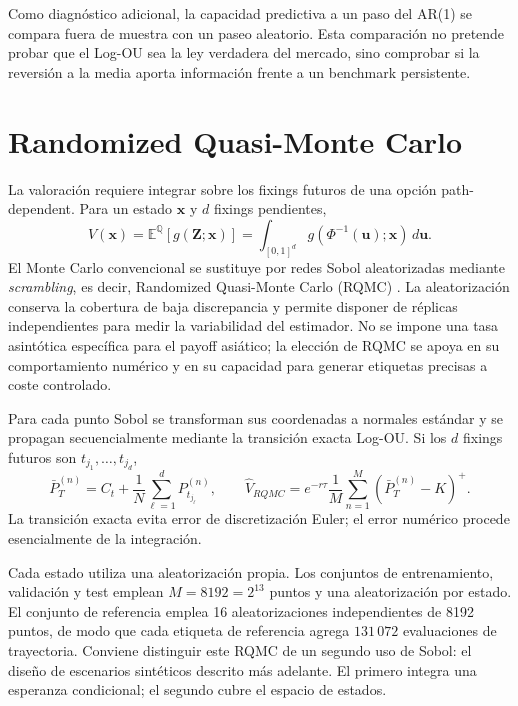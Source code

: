 Como diagnóstico adicional, la capacidad predictiva a un paso del AR(1) se
compara fuera de muestra con un paseo aleatorio. Esta comparación no pretende
probar que el Log-OU sea la ley verdadera del mercado, sino comprobar si la
reversión a la media aporta información frente a un benchmark persistente.


\section{Randomized Quasi-Monte Carlo}
\label{sec:rqmc}

La valoración requiere integrar sobre los fixings futuros de una opción
path-dependent. Para un estado $\mathbf x$ y $d$ fixings pendientes,
\begin{equation}
    V(\mathbf x)=\mathbb E^{\mathbb Q}[g(\mathbf Z;\mathbf x)]
    =\int_{[0,1]^d}g(\Phi^{-1}(\mathbf u);\mathbf x)\,d\mathbf u.
    \label{eq:unit_cube_integral}
\end{equation}
El Monte Carlo convencional se sustituye por redes Sobol aleatorizadas mediante
\textit{scrambling}, es decir, Randomized Quasi-Monte Carlo (RQMC)
\parencite{sobol_1967,owen_1997}. La aleatorización conserva la cobertura de
baja discrepancia y permite disponer de réplicas independientes para medir la
variabilidad del estimador. No se impone una tasa asintótica específica para el
payoff asiático; la elección de RQMC se apoya en su comportamiento numérico y en
su capacidad para generar etiquetas precisas a coste controlado.

Para cada punto Sobol se transforman sus coordenadas a normales estándar y se
propagan secuencialmente mediante la transición exacta Log-OU. Si los $d$
fixings futuros son $t_{j_1},\ldots,t_{j_d}$,
\begin{equation}
    \bar P_T^{(n)}=C_t+\frac{1}{N}\sum_{\ell=1}^{d}P_{t_{j_\ell}}^{(n)},
    \qquad
    \widehat V_{RQMC}=e^{-r\tau}\frac{1}{M}
    \sum_{n=1}^{M}(\bar P_T^{(n)}-K)^+.
    \label{eq:rqmc_asian_price}
\end{equation}
La transición exacta evita error de discretización Euler; el error numérico
procede esencialmente de la integración.

Cada estado utiliza una aleatorización propia. Los conjuntos de entrenamiento,
validación y test emplean $M=8192=2^{13}$ puntos y una aleatorización por estado.
El conjunto de referencia emplea 16 aleatorizaciones independientes de 8192
puntos, de modo que cada etiqueta de referencia agrega $131\,072$ evaluaciones
de trayectoria. Conviene distinguir este RQMC de un segundo uso de Sobol: el
diseño de escenarios sintéticos descrito más adelante. El primero integra una
esperanza condicional; el segundo cubre el espacio de estados.


